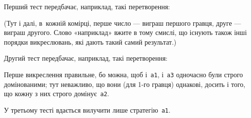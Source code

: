 \Note
Перший тест передбачає, наприклад, такі перетворення:


(Тут і далі, в~кожній комірці, перше число --- виграш першого гравця, друге --- виграш другого.
Слово «наприклад» вжите в тому смислі, що існують також інші порядки викреслювань, які дають такий самий результат.)

Другий тест передбачає, наприклад, такі перетворення:


Перше викреслення правильне, бо можна, щоб і~\texttt{a1}, і~\texttt{a3} одночасно були строго домінованими;
тут неважливо, що вони (для 1-го гравця) однакові, досить і того, що кожну з них строго домінує~\texttt{a2}.

У третьому тесті вдається вилучити лише стратегію~\texttt{a1}.
